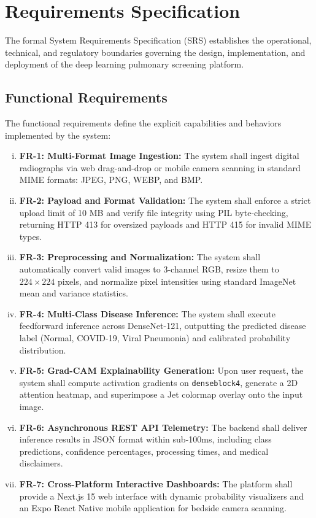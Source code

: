 \documentclass[12pt,a4paper]{report}
\begin{document}
\chapter{Requirements Specification}

The formal System Requirements Specification (SRS) establishes the operational, technical, and regulatory boundaries governing the design, implementation, and deployment of the deep learning pulmonary screening platform.

\section{Functional Requirements}
The functional requirements define the explicit capabilities and behaviors implemented by the system:
\begin{enumerate}[(i)]
    \item \textbf{FR-1: Multi-Format Image Ingestion:} The system shall ingest digital radiographs via web drag-and-drop or mobile camera scanning in standard MIME formats: JPEG, PNG, WEBP, and BMP.
    \item \textbf{FR-2: Payload and Format Validation:} The system shall enforce a strict upload limit of 10 MB and verify file integrity using PIL byte-checking, returning HTTP 413 for oversized payloads and HTTP 415 for invalid MIME types.
    \item \textbf{FR-3: Preprocessing and Normalization:} The system shall automatically convert valid images to 3-channel RGB, resize them to $224 \times 224$ pixels, and normalize pixel intensities using standard ImageNet mean and variance statistics.
    \item \textbf{FR-4: Multi-Class Disease Inference:} The system shall execute feedforward inference across DenseNet-121, outputting the predicted disease label (Normal, COVID-19, Viral Pneumonia) and calibrated probability distribution.
    \item \textbf{FR-5: Grad-CAM Explainability Generation:} Upon user request, the system shall compute activation gradients on \texttt{denseblock4}, generate a 2D attention heatmap, and superimpose a Jet colormap overlay onto the input image.
    \item \textbf{FR-6: Asynchronous REST API Telemetry:} The backend shall deliver inference results in JSON format within sub-100ms, including class predictions, confidence percentages, processing times, and medical disclaimers.
    \item \textbf{FR-7: Cross-Platform Interactive Dashboards:} The platform shall provide a Next.js 15 web interface with dynamic probability visualizers and an Expo React Native mobile application for bedside camera scanning.
\end{enumerate}
\end{document}
